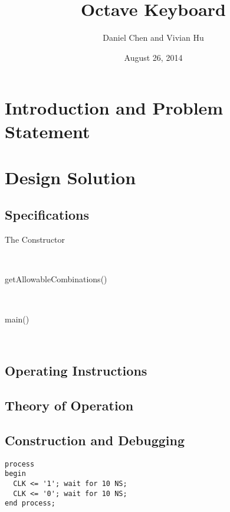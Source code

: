 \documentclass{article}
\title{Octave Keyboard}
\author{Daniel Chen and Vivian Hu}
\date{August 26, 2014}
\begin{document}
\maketitle


\tableofcontents

\newpage

\section{Introduction and Problem Statement}
\newpage




\section{Design Solution}
  \subsection{Specifications}

    \begin{description}

      \item[The Constructor] \hfill \\

      \item[getAllowableCombinations()] \hfill \\

      \item[main()] \hfill \\

    \end{description}

  \subsection{Operating Instructions}
  \subsection{Theory of Operation}
  \subsection{Construction and Debugging}

    \begin{verbatim}
process
begin
  CLK <= '1'; wait for 10 NS;
  CLK <= '0'; wait for 10 NS;
end process;
    \end{verbatim}
\newpage
\end{document}
